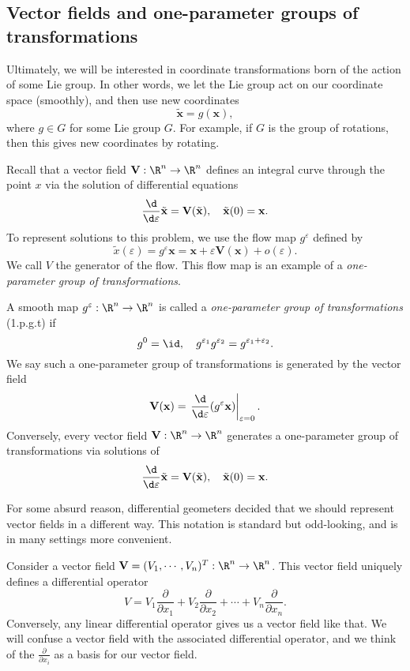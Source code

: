 \documentclass[a4paper]{article}
\begin{document}
\subsection{Vector fields and one-parameter groups of transformations}
Ultimately, we will be interested in coordinate transformations born of the action of some Lie group. In other words, we let the Lie group act on our coordinate space (smoothly), and then use new coordinates
\[
  \tilde{\mathbf{x}} = g(\mathbf{x}),
\]
where $g \in G$ for some Lie group $G$. For example, if $G$ is the group of rotations, then this gives new coordinates by rotating.

Recall that a vector field $\mathbf{V}: \R^n \to \R^n$ defines an integral curve through the point $x$ via the solution of differential equations
\[
  \frac{\d}{\d \varepsilon} \tilde{\mathbf{x}} = \mathbf{V}(\tilde{\mathbf{x}}),\quad \tilde{\mathbf{x}}(0) = \mathbf{x}.
\]
To represent solutions to this problem, we use the flow map $g^\varepsilon$ defined by
\[
  \tilde{x}(\varepsilon) = g^\varepsilon \mathbf{x} = \mathbf{x} + \varepsilon \mathbf{V}(\mathbf{x}) + o(\varepsilon).
\]
We call $V$ the generator of the flow. This flow map is an example of a \emph{one-parameter group of transformations}.
\begin{defi}
  A smooth map $g^\varepsilon: \R^n \to \R^n$ is called a \emph{one-parameter group of transformations} (1.p.g.t) if
  \[
    g^0 = \id,\quad g^{\varepsilon_1}g^{\varepsilon_2} = g^{\varepsilon_1 + \varepsilon_2}.
  \]
  We say such a one-parameter group of transformations is generated by the vector field
  \[
    \mathbf{V}(\mathbf{x}) = \left.\frac{\d}{\d \varepsilon} (g^\varepsilon \mathbf{x}) \right|_{\varepsilon = 0}.
  \]
  Conversely, every vector field $\mathbf{V}: \R^n \to \R^n$ generates a one-parameter group of transformations via solutions of
  \[
    \frac{\d}{\d \varepsilon} \tilde{\mathbf{x}} = \mathbf{V}(\tilde{\mathbf{x}}),\quad \tilde{\mathbf{x}}(0) = \mathbf{x}.
  \]
\end{defi}
For some absurd reason, differential geometers decided that we should represent vector fields in a different way. This notation is standard but odd-looking, and is in many settings more convenient.
\begin{notation}
  Consider a vector field $\mathbf{V} = (V_1, \cdots, V_n)^T : \R^n \to \R^n$. This vector field uniquely defines a differential operator
  \[
    V = V_1 \frac{\partial}{\partial x_1} + V_2 \frac{\partial}{\partial x_2} + \cdots + V_n \frac{\partial}{\partial x_n}.
  \]
  Conversely, any linear differential operator gives us a vector field like that. We will confuse a vector field with the associated differential operator, and we think of the $\frac{\partial}{\partial x_i}$ as a basis for our vector field.
\end{notation}
\end{document}
